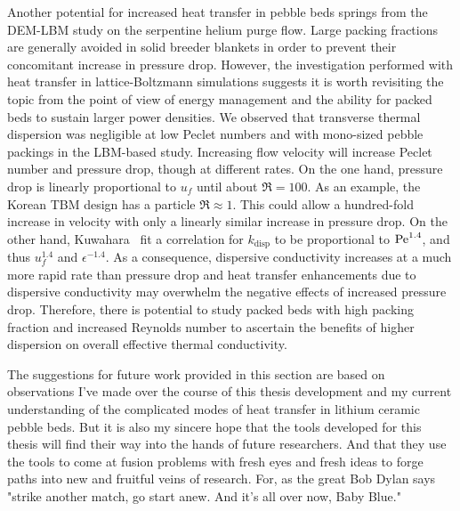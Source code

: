 Another potential for increased heat transfer in pebble beds springs from the DEM-LBM study on the serpentine helium purge flow. Large packing fractions are generally avoided in solid breeder blankets in order to prevent their concomitant increase in pressure drop. However, the investigation performed with heat transfer in lattice-Boltzmann simulations suggests it is worth revisiting the topic from the point of view of energy management and the ability for packed beds to sustain larger power densities. We observed that transverse thermal dispersion was negligible at low Peclet numbers and with mono-sized pebble packings in the LBM-based study. Increasing flow velocity will increase Peclet number and pressure drop, though at different rates. On the one hand, pressure drop is linearly proportional to $u_f$ until about $\Re = 100$. As an example, the Korean TBM design has a particle $\Re \approx 1$. This could allow a hundred-fold increase in velocity with only a linearly similar increase in pressure drop. On the other hand, Kuwahara \etal~fit a correlation for $k_\text{disp}$ to be proportional to $\mathrm{Pe}^{1.4}$, and thus $u_f^{1.4}$ and $\epsilon^{-1.4}$. As a consequence, dispersive conductivity increases at a much more rapid rate than pressure drop and heat transfer enhancements due to dispersive conductivity may overwhelm the negative effects of increased pressure drop. Therefore, there is potential to study packed beds with high packing fraction and increased Reynolds number to ascertain the benefits of higher dispersion on overall effective thermal conductivity.

The suggestions for future work provided in this section are based on observations I've made over the course of this thesis development and my current understanding of the complicated modes of heat transfer in lithium ceramic pebble beds. But it is also my sincere hope that the tools developed for this thesis will find their way into the hands of future researchers. And that they use the tools to come at fusion problems with fresh eyes and fresh ideas to forge paths into new and fruitful veins of research. For, as the great Bob Dylan says "strike another match, go start anew. And it's all over now, Baby Blue."






